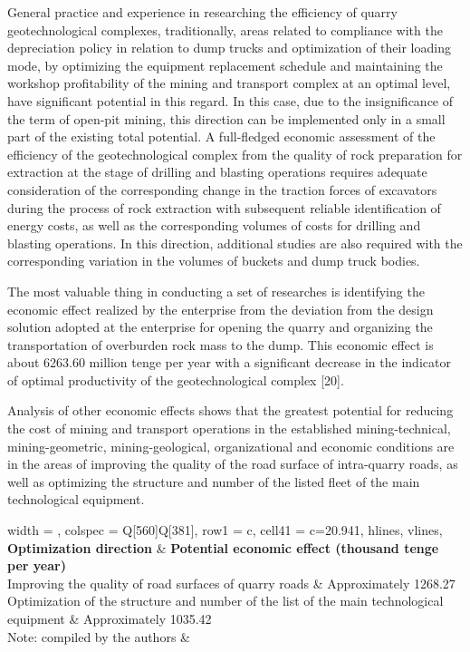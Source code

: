 \begin{multicols}{2}
General practice and experience in researching the efficiency of quarry
geotechnological complexes, traditionally, areas related to compliance
with the depreciation policy in relation to dump trucks and optimization
of their loading mode, by optimizing the equipment replacement schedule
and maintaining the workshop profitability of the mining and transport
complex at an optimal level, have significant potential in this regard.
In this case, due to the insignificance of the term of open-pit mining,
this direction can be implemented only in a small part of the existing
total potential. A full-fledged economic assessment of the efficiency of
the geotechnological complex from the quality of rock preparation for
extraction at the stage of drilling and blasting operations requires
adequate consideration of the corresponding change in the traction
forces of excavators during the process of rock extraction with
subsequent reliable identification of energy costs, as well as the
corresponding volumes of costs for drilling and blasting operations. In
this direction, additional studies are also required with the
corresponding variation in the volumes of buckets and dump truck bodies.

The most valuable thing in conducting a set of researches is identifying
the economic effect realized by the enterprise from the deviation from
the design solution adopted at the enterprise for opening the quarry and
organizing the transportation of overburden rock mass to the dump. This
economic effect is about 6263.60 million tenge per year with a
significant decrease in the indicator of optimal productivity of the
geotechnological complex {[}20{]}.

Analysis of other economic effects shows that the greatest potential for
reducing the cost of mining and transport operations in the established
mining-technical, mining-geometric, mining-geological, organizational
and economic conditions are in the areas of improving the quality of the
road surface of intra-quarry roads, as well as optimizing the structure
and number of the listed fleet of the main technological equipment.
\end{multicols}

\begin{longtblr}[
  label = none,
  entry = none,
]{
  width = \linewidth,
  colspec = {Q[560]Q[381]},
  row{1} = {c},
  cell{4}{1} = {c=2}{0.941\linewidth},
  hlines,
  vlines,
}
\textbf{Optimization			direction} & \textbf{Potential			economic effect (thousand tenge per year)}\\
Improving
			the quality of road surfaces of quarry roads & Approximately
			1268.27\\
Optimization
			of the structure and number of the list of the main technological
			equipment & Approximately
			1035.42\\
Note:
			compiled by the authors & 
\end{longtblr}

